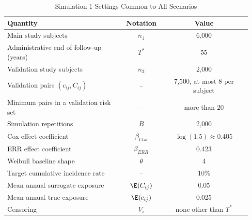 \begin{table}[!htbp]
\small
\centering
\caption{Simulation 1 Settings Common to All Scenarios}
\begin{tabular}{|l|c|c|}
\hline
\bf Quantity & \bf Notation & \bf Value \\
\hline
Main study subjects & $n_1$ & 6,000 \\
\hline
Administrative end of follow-up (years) & $T^{*}$ & 55 \\
\hline
Validation study subjects & $n_2$ & 2,000 \\
\hline
Validation pairs $(c_{ij},C_{ij})$ & -- & 7,500, at most 8 per subject \\
\hline
Minimum pairs in a validation risk set & -- & more than 20 \\
\hline
Simulation repetitions & $B$ & 2,000 \\
\hline
Cox effect coefficient & $\beta_{Cox}$ & $\log(1.5)\approx 0.405$ \\
\hline
ERR effect coefficient & $\beta_{ERR}$ & 0.423 \\
\hline
Weibull baseline shape & $\theta$ & 4 \\
\hline
Target cumulative incidence rate & -- & 10\% \\
\hline
Mean annual surrogate exposure & $\E(C_{ij})$ & 0.05 \\
\hline
Mean annual true exposure & $\E(c_{ij})$ & 0.025 \\
\hline
Censoring & $V_i$ & none other than $T^{*}$ \\
\hline
\end{tabular}
\label{tab:sim1_settings_common}
\end{table}

